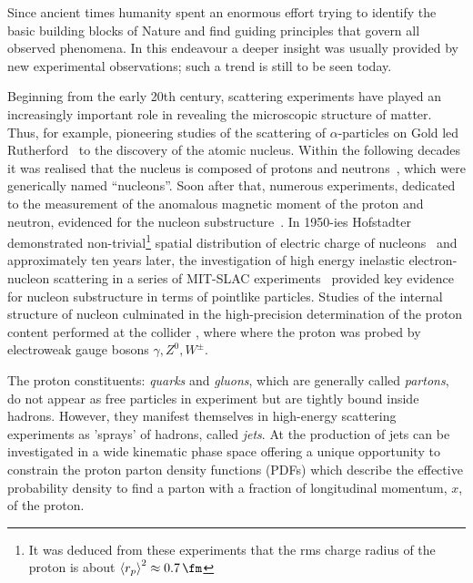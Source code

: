 Since ancient times humanity spent an enormous effort trying to identify the basic building blocks of Nature and find guiding principles that govern all observed phenomena. In this endeavour a deeper insight was usually provided by new experimental observations; such a trend is still to be seen today.

Beginning from the early 20th century, scattering experiments have played an increasingly important role in revealing the microscopic structure of matter. Thus, for example, pioneering studies of the scattering of $\alpha$-particles on Gold led Rutherford~\cite{pm:21:669} to the discovery of the atomic nucleus. Within the following decades it was realised that the nucleus is composed of protons and neutrons~\cite{Chadwick:1932ma}, which were generically named ``nucleons''. Soon after that, numerous experiments, dedicated to the measurement of the anomalous magnetic moment of the proton and neutron, evidenced for the nucleon substructure~\cite{Frisch:1933, Bacher:1933, Alvarez:1940}. In 1950-ies Hofstadter demonstrated non-trivial\footnote{It was deduced from these experiments that the rms charge radius of the proton is about $\left\langle r_{p} \right\rangle^2 \approx 0.7\,\fm$} spatial distribution of electric charge of nucleons~\cite{Hofstadter:1963} and approximately ten years later, the investigation of high energy inelastic electron-nucleon scattering in a series of MIT-SLAC experiments~\cite{Panofsky:1968pb, Bloom:1969kc, Briedenbach:1969, Taylor:1991ew, Kendall:1991np} provided key evidence for nucleon substructure in terms of pointlike particles. Studies of the internal structure of nucleon culminated in the high-precision determination of the proton content performed at the \ep collider \hera, where where the proton was probed by electroweak gauge bosons $\gamma, Z^0, W^{\pm}$.

The proton constituents: \emph{quarks} and \emph{gluons}, which are generally called \emph{partons}, do not appear as free particles in experiment but are tightly bound inside hadrons. However, they manifest themselves in high-energy scattering experiments as 'sprays' of hadrons, called \emph{jets}. At \hera the production of jets can be investigated in a wide kinematic phase space offering a unique opportunity to constrain the proton parton density functions (PDFs) which describe the effective probability density to find a parton with a fraction of longitudinal momentum, $x$, of the proton.

